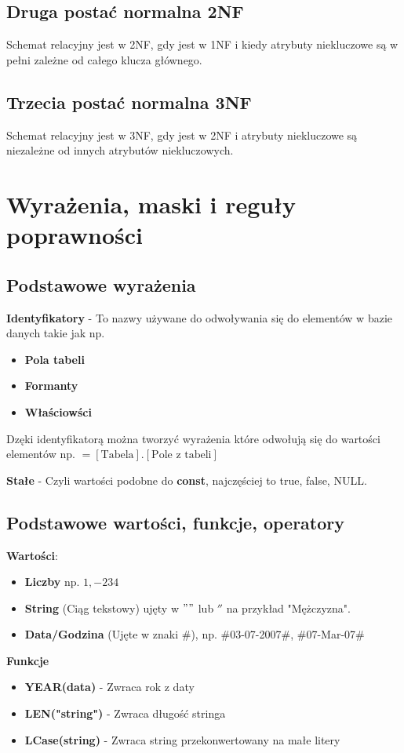 \documentclass[12pt, a4paper]{article}
\begin{document}
\subsection*{Druga postać normalna 2NF}
Schemat relacyjny jest w 2NF, gdy jest w 1NF i kiedy atrybuty niekluczowe są
w pełni zależne od całego klucza głównego.
\subsection*{Trzecia postać normalna 3NF}
Schemat relacyjny jest w 3NF, gdy jest w 2NF i atrybuty niekluczowe są niezależne od innych
atrybutów niekluczowych.
\section{Wyrażenia, maski i reguły poprawności}
\subsection*{Podstawowe wyrażenia}
\textbf{Identyfikatory} - To nazwy używane do odwoływania się do elementów w bazie danych takie jak np.
\begin{itemize}
  \item \textbf{Pola tabeli}
  \item \textbf{Formanty}
  \item \textbf{Właściowści}
\end{itemize}
Dzęki identyfikatorą można tworzyć wyrażenia które odwołują się do wartości elementów np.
$= [\text{Tabela}].[\text{Pole z tabeli}]$
\vspace{1em}

\textbf{Stałe} - Czyli wartości podobne do \textbf{const}, najczęściej to true, false, NULL.
\subsection*{Podstawowe wartości, funkcje, operatory}
\textbf{Wartości}:
\begin{itemize}
  \item \textbf{Liczby} np. $1, -234$
  \item \textbf{String} (Ciąg tekstowy) ujęty w $""$ lub $''$ na przykład "Mężczyzna".
  \item \textbf{Data/Godzina} (Ujęte w znaki \#), np. \#03-07-2007\#, \#07-Mar-07\#
\end{itemize}
\vspace{1em}

\textbf{Funkcje}
\begin{itemize}
  \item \textbf{YEAR(data)} - Zwraca rok z daty
  \item \textbf{LEN("string")} - Zwraca długość stringa
  \item \textbf{LCase(string)} - Zwraca string przekonwertowany na małe litery
\end{itemize}
\vspace{1em}
\end{document}
